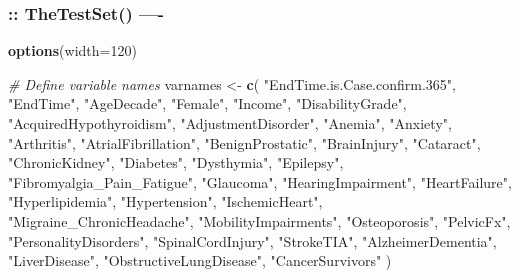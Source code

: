 \documentclass[
]{article}
\newenvironment{Shaded}{\begin{snugshade}}{\end{snugshade}}
\newcommand{\AttributeTok}[1]{\textcolor[rgb]{0.13,0.29,0.53}{#1}}
\newcommand{\CommentTok}[1]{\textcolor[rgb]{0.56,0.35,0.01}{\textit{#1}}}
\newcommand{\DecValTok}[1]{\textcolor[rgb]{0.00,0.00,0.81}{#1}}
\newcommand{\FunctionTok}[1]{\textcolor[rgb]{0.13,0.29,0.53}{\textbf{#1}}}
\newcommand{\NormalTok}[1]{#1}
\newcommand{\OtherTok}[1]{\textcolor[rgb]{0.56,0.35,0.01}{#1}}
\newcommand{\StringTok}[1]{\textcolor[rgb]{0.31,0.60,0.02}{#1}}
\begin{document}
\hypertarget{thetestset--}{%
\subsubsection{:: TheTestSet() ----}\label{thetestset--}}

\begin{Shaded}
\begin{Highlighting}[]
\FunctionTok{options}\NormalTok{(}\AttributeTok{width=}\DecValTok{120}\NormalTok{)}

\CommentTok{\# Define variable names}
\NormalTok{varnames }\OtherTok{\textless{}{-}} \FunctionTok{c}\NormalTok{(}
  \StringTok{"EndTime.is.Case.confirm.365"}\NormalTok{, }\StringTok{"EndTime"}\NormalTok{, }\StringTok{"AgeDecade"}\NormalTok{, }\StringTok{"Female"}\NormalTok{, }\StringTok{"Income"}\NormalTok{,}
  \StringTok{"DisabilityGrade"}\NormalTok{, }\StringTok{"AcquiredHypothyroidism"}\NormalTok{, }\StringTok{"AdjustmentDisorder"}\NormalTok{, }\StringTok{"Anemia"}\NormalTok{,}
  \StringTok{"Anxiety"}\NormalTok{, }\StringTok{"Arthritis"}\NormalTok{, }\StringTok{"AtrialFibrillation"}\NormalTok{, }\StringTok{"BenignProstatic"}\NormalTok{,}
  \StringTok{"BrainInjury"}\NormalTok{, }\StringTok{"Cataract"}\NormalTok{, }\StringTok{"ChronicKidney"}\NormalTok{, }\StringTok{"Diabetes"}\NormalTok{, }\StringTok{"Dysthymia"}\NormalTok{,}
  \StringTok{"Epilepsy"}\NormalTok{, }\StringTok{"Fibromyalgia\_Pain\_Fatigue"}\NormalTok{, }\StringTok{"Glaucoma"}\NormalTok{, }\StringTok{"HearingImpairment"}\NormalTok{,}
  \StringTok{"HeartFailure"}\NormalTok{, }\StringTok{"Hyperlipidemia"}\NormalTok{, }\StringTok{"Hypertension"}\NormalTok{, }\StringTok{"IschemicHeart"}\NormalTok{,}
  \StringTok{"Migraine\_ChronicHeadache"}\NormalTok{, }\StringTok{"MobilityImpairments"}\NormalTok{, }\StringTok{"Osteoporosis"}\NormalTok{,}
  \StringTok{"PelvicFx"}\NormalTok{, }\StringTok{"PersonalityDisorders"}\NormalTok{, }\StringTok{"SpinalCordInjury"}\NormalTok{, }\StringTok{"StrokeTIA"}\NormalTok{,}
  \StringTok{"AlzheimerDementia"}\NormalTok{, }\StringTok{"LiverDisease"}\NormalTok{, }\StringTok{"ObstructiveLungDisease"}\NormalTok{,}
  \StringTok{"CancerSurvivors"}
\NormalTok{)}


\end{Highlighting}
\end{Shaded}
\end{document}
